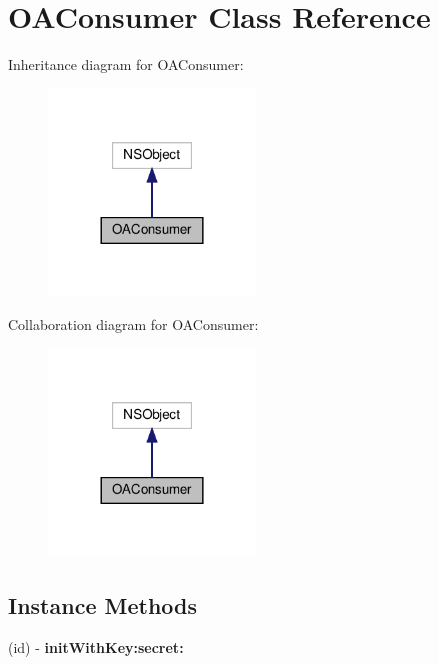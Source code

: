 \hypertarget{interfaceOAConsumer}{}\section{O\+A\+Consumer Class Reference}
\label{interfaceOAConsumer}


Inheritance diagram for O\+A\+Consumer\+:
\nopagebreak
\begin{figure}[H]
\begin{center}
\leavevmode
\includegraphics[width=156pt]{interfaceOAConsumer__inherit__graph}
\end{center}
\end{figure}


Collaboration diagram for O\+A\+Consumer\+:
\nopagebreak
\begin{figure}[H]
\begin{center}
\leavevmode
\includegraphics[width=156pt]{interfaceOAConsumer__coll__graph}
\end{center}
\end{figure}
\subsection*{Instance Methods}
\begin{DoxyCompactItemize}
\item 
\mbox{\label{interfaceOAConsumer_adf3457187731c59be24eb623af86356c}} 
(id) -\/ {\bfseries init\+With\+Key\+:secret\+:}
\end{DoxyCompactItemize}
